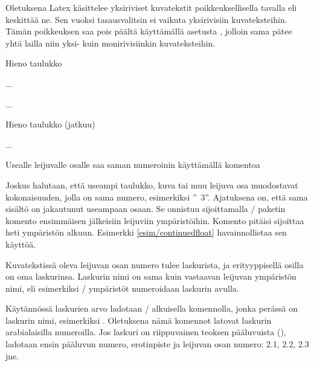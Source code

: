 \begin{koodilohkosis}
\end{koodilohkosis}

\noindent
Oletuksena Latex käsittelee yksiriviset kuvatekstit poikkeuksellisella
tavalla eli keskittää ne. Sen vuoksi tasausvalitsin
 ei vaikuta yksirivisiin kuvateksteihin. Tämän
poikkeuksen saa pois päältä käyttämällä asetusta
, jolloin sama
 pätee yhtä lailla niin yksi- kuin monirivisiinkin
kuvateksteihin.

\begin{esimerkki*}

\begin{koodilohko}
\begin{table}                 %
  \caption{Hieno taulukko}
  ...
\end{table}
...
\begin{table}                 %
  \ContinuedFloat             %
  \caption{Hieno taulukko (jatkuu)}
  ...
\end{table}
\end{koodilohko}

  \caption{Usealle leijuvalle osalle saa saman numeroinin käyttämällä
    komentoa }
  \label{esim/continuedfloat}
\end{esimerkki*}

Joskus halutaan, että useampi taulukko, kuva tai muu leijuva osa
muodostavat kokonaisuuden, jolla on sama numero, esimerkiksi
''\tablename~3''. Ajatuksena on, että sama sisältö on jakautunut
useampaan osaan. Se onnistuu sijoittamalla \-/ paketin
komento  ensimmäisen jälkeisiin leijuviin
ympäristöihin. Komento pitäisi sijoittaa heti ympäristön alkuun.
Esimerkki \ref{esim/continuedfloat} havainnollistaa sen käyttöä.

Kuvatekstissä oleva leijuvan osan numero tulee laskurista, ja
erityyppisellä osilla on oma laskurinsa. Laskurin nimi on sama kuin
vastaavan leijuvan ympäristön nimi, eli esimerkiksi \-/
ympäristöt numeroidaan laskurin  avulla.

Käytännössä laskurien arvo ladotaan \-/ alkuisella
komennolla, jonka perässä on laskurin nimi, esimerkiksi
. Oletuksena nämä komennot latovat laskurin
arabialaisilla numeroilla. Jos laskuri on riippuvainen teoksen
pääluvuista (), ladotaan ensin pääluvun numero,
erotinpiste ja leijuvan osan numero: 2.1, 2.2, 2.3 jne.


